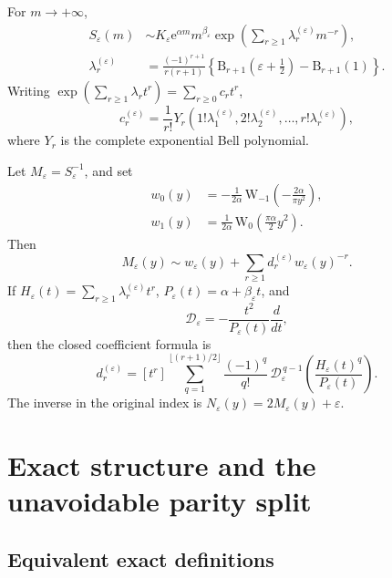 \documentclass[11pt,a4paper]{article}
\theoremstyle{clean}
\theoremstyle{definition}
\newcommand{\e}{\mathrm e}
\newcommand{\eps}{\varepsilon}
\newcommand{\al}{\alpha}
\newcommand{\be}{\beta}
\newcommand{\B}{\mathrm B}
\newcommand{\W}{\mathrm W}
\newcommand{\Coeff}[2]{\left[#1\right]#2}
\newcommand{\Dop}{\mathscr D}
\begin{document}
\begin{resultbox}
For \(m\to+\infty\),
\begin{align}
 S_\eps(m)
 &\sim K_\eps\e^{\al m}m^{\be_\eps}
 \exp\!\left(\sum_{r\ge1}\lambda_r^{(\eps)}m^{-r}\right),
 \label{eq:summary-direct-log}\\
 \lambda_r^{(\eps)}
 &=\frac{(-1)^{r+1}}{r(r+1)}
 \left\{\B_{r+1}\!\left(\eps+\frac12\right)-\B_{r+1}(1)\right\}.
 \label{eq:summary-lambda}
\end{align}
Writing \(\exp(\sum_{r\ge1}\lambda_rt^r)=\sum_{r\ge0}c_rt^r\),
\begin{equation}
 c_r^{(\eps)}=\frac1{r!}
 Y_r\!\left(1!\lambda_1^{(\eps)},2!\lambda_2^{(\eps)},\ldots,r!\lambda_r^{(\eps)}\right),
 \label{eq:summary-c}
\end{equation}
where \(Y_r\) is the complete exponential Bell polynomial.

Let \(M_\eps=S_\eps^{-1}\), and set
\begin{align}
 w_0(y)&=-\frac1{2\al}\,
 \W_{-1}\!\left(-\frac{2\al}{\pi y^2}\right),
 \label{eq:summary-w0}\\
 w_1(y)&=\frac1{2\al}\,
 \W_0\!\left(\frac{\pi\al}{2}y^2\right).
 \label{eq:summary-w1}
\end{align}
Then
\begin{equation}
 M_\eps(y)\sim w_\eps(y)+\sum_{r\ge1}d_r^{(\eps)}w_\eps(y)^{-r}.
 \label{eq:summary-inverse}
\end{equation}
If \(H_\eps(t)=\sum_{r\ge1}\lambda_r^{(\eps)}t^r\),
\(P_\eps(t)=\al+\be_\eps t\), and
\begin{equation}
 \Dop_\eps=-\frac{t^2}{P_\eps(t)}\frac{d}{dt},
 \label{eq:summary-Dop}
\end{equation}
then the closed coefficient formula is
\begin{equation}
 d_r^{(\eps)}=
 \Coeff{t^r}{
 \sum_{q=1}^{\lfloor(r+1)/2\rfloor}
 \frac{(-1)^q}{q!}\,
 \Dop_\eps^{\,q-1}
 \left(\frac{H_\eps(t)^q}{P_\eps(t)}\right)}.
 \label{eq:summary-d}
\end{equation}
The inverse in the original index is \(N_\eps(y)=2M_\eps(y)+\eps\).
\end{resultbox}

\section{Exact structure and the unavoidable parity split}
\label{sec:exact}

\subsection{Equivalent exact definitions}
\end{document}
